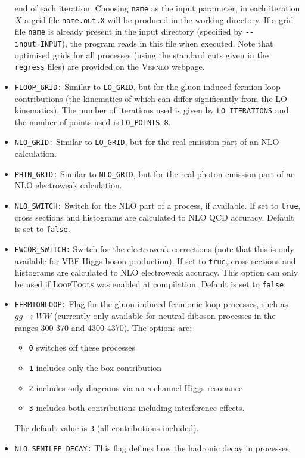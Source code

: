 \documentclass[english,12pt]{article}
\begin{document}
\begin{itemize}
end of each iteration. Choosing {\tt name} as the input parameter, in each
iteration $X$ a grid file {\tt name.out.X} will be produced in the working
directory. If a grid file {\tt name} is already present in the input directory
(specified by {\tt -{}-input=INPUT}), the program reads in this file when
executed.  Note that optimised grids for all processes (using the standard cuts
given in the {\tt regress} files) are provided on the \textsc{Vbfnlo} webpage.
\item{\tt FLOOP\_GRID:} Similar to {\tt LO\_GRID}, but for the gluon-induced fermion
loop contributions (the kinematics of which can differ significantly from the LO
kinematics).  The number of iterations used is given by {\tt LO\_ITERATIONS} and the number of points used is {\tt LO\_POINTS--8}.
\item {\tt NLO\_GRID:} Similar to {\tt LO\_GRID}, but for the real emission part
of an NLO calculation.
\item {\tt PHTN\_GRID:} Similar to {\tt NLO\_GRID}, but for the real photon
emission part of an NLO electroweak calculation.
\item {\tt NLO\_SWITCH:} Switch for the NLO part of a process, if available.
If set to {\tt true}, cross sections and histograms are calculated to NLO
QCD  accuracy. Default is set to {\tt false}.
\item{\tt EWCOR\_SWITCH:} Switch for the electroweak corrections (note that this
is only available for VBF Higgs boson production). If set to {\tt true}, cross
sections and histograms are calculated to NLO electroweak  accuracy. This option
can only be used if \textsc{LoopTools} was enabled at compilation.  Default is
set to {\tt false}.  
\item{\tt FERMIONLOOP:} Flag for the gluon-induced fermionic loop processes,
such as $gg \rightarrow WW$ (currently only available for neutral diboson
processes in the ranges 300-370 and 4300-4370). The options are: 
  \begin{itemize}
  \item {\tt 0} switches off these processes
  \item {\tt 1} includes only the box contribution 
  \item {\tt 2} includes only diagrams via an $s$-channel Higgs resonance
  \item {\tt 3} includes both contributions including interference effects. 
  \end{itemize}
The default value is {\tt 3} (all contributions included).  
\item{\tt NLO\_SEMILEP\_DECAY:} This flag defines how the hadronic decay in processes

\end{itemize}
\end{document}

